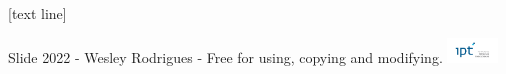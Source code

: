 \usepackage{silence}
\WarningsOff[biblatex]


\renewcommand{\chaptername}{Capítulo}
\renewcommand{\contentsname}{Sumário}


[text line]{
    \parbox{0.90\linewidth}{
        \vspace*{-8em}
        Slide \insertpagenumber
        \hfill
        2022 - Wesley Rodrigues -
        Free for using, copying and modifying.
        \hfill
        \includegraphics[width=0.10\textwidth]{logos/logo_ipt_light_700_350.png}
    }}



